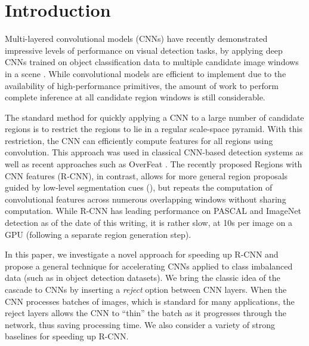 \section{Introduction}\label{introduction}

Multi-layered convolutional models (CNNs) have recently demonstrated impressive levels of performance on visual detection tasks, by applying deep CNNs trained on object classification data to multiple candidate image windows in a scene \cite{Sermanet-ICLR-2014,Girshick-CVPR-2014}.
While convolutional models are efficient to implement due to the availability of high-performance primitives, the amount of work to perform complete inference at all candidate region windows is still considerable.

The standard method for quickly applying a CNN to a large number of candidate regions is to restrict the regions to lie in a regular scale-space pyramid.
With this restriction, the CNN can efficiently compute features for all regions using convolution.
This approach was used in classical CNN-based detection systems as well as recent approaches such as OverFeat \cite{Sermanet-ICLR-2014}.
The recently proposed Regions with CNN features (R-CNN), in contrast, allows for more general region proposals guided by low-level segmentation cues (\cite{Uijlings-IJCV-2013}), but repeats the computation of convolutional features across numerous overlapping windows without sharing computation.
While R-CNN has leading performance on PASCAL and ImageNet detection as of the date of this writing, it is rather slow, at 10s per image on a GPU (following a separate region generation step).

In this paper, we investigate a novel approach for speeding up R-CNN and propose a general technique for accelerating CNNs applied to class imbalanced data (such as in object detection datasets).
We bring the classic idea of the cascade to CNNs by inserting a \emph{reject} option between CNN layers.
When the CNN processes batches of images, which is standard for many applications, the reject layers allows the CNN to ``thin'' the batch as it progresses through the network, thus saving processing time.
We also consider a variety of strong baselines for speeding up R-CNN.
